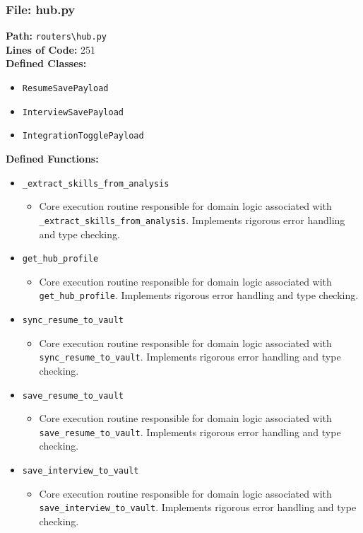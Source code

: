 \documentclass[10pt,journal,compsoc]{IEEEtran}
\begin{document}
\subsubsection{File: hub.py}
\textbf{Path:} \texttt{routers\textbackslash{}hub.py} \\
\textbf{Lines of Code:} 251 \\
\textbf{Defined Classes:}
\begin{itemize}
    \item \texttt{ResumeSavePayload}
    \item \texttt{InterviewSavePayload}
    \item \texttt{IntegrationTogglePayload}
\end{itemize}
\textbf{Defined Functions:}
\begin{itemize}
    \item \texttt{\_extract\_skills\_from\_analysis}
    \begin{itemize} \item Core execution routine responsible for domain logic associated with \texttt{\_extract\_skills\_from\_analysis}. Implements rigorous error handling and type checking. \end{itemize}
    \item \texttt{get\_hub\_profile}
    \begin{itemize} \item Core execution routine responsible for domain logic associated with \texttt{get\_hub\_profile}. Implements rigorous error handling and type checking. \end{itemize}
    \item \texttt{sync\_resume\_to\_vault}
    \begin{itemize} \item Core execution routine responsible for domain logic associated with \texttt{sync\_resume\_to\_vault}. Implements rigorous error handling and type checking. \end{itemize}
    \item \texttt{save\_resume\_to\_vault}
    \begin{itemize} \item Core execution routine responsible for domain logic associated with \texttt{save\_resume\_to\_vault}. Implements rigorous error handling and type checking. \end{itemize}
    \item \texttt{save\_interview\_to\_vault}
    \begin{itemize} \item Core execution routine responsible for domain logic associated with \texttt{save\_interview\_to\_vault}. Implements rigorous error handling and type checking. \end{itemize}

\end{itemize}
\end{document}
